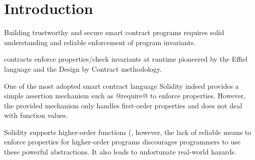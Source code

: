 \documentclass[acmsmall,review,anonymous]{acmart}\settopmatter{printfolios=true,printccs=false,printacmref=false}
\begin{document}




\maketitle


\section{Introduction}


Building trustworthy and secure smart contract programs requires solid
understanding and reliable enforcement of program invariants.

contracts enforce properties/check invariants at runtime pioneered by the
Effiel language and the Design by Contract methodology.

One of the most adopted smart contract language Solidity indeed provides a
simple assertion mechanism such as @require@ to enforce properties.
However, the provided mechanism only handles first-order properties and does
not deal with function values.  

Solidity supports higher-order functions (, however, the lack of reliable means to enforce properties
for higher-order programs discourages programmers to use these powerful
abstractions. It also leads to unfortunate real-world hazards.
\end{document}
